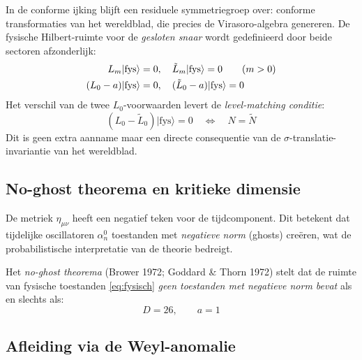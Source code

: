 \documentclass[12pt,a4paper]{article}
\begin{document}
            In de conforme ijking blijft een residuele symmetriegroep over: conforme transformaties van het wereldblad, die precies de Virasoro-algebra genereren. De fysische Hilbert-ruimte voor de \emph{gesloten snaar} wordt gedefinieerd door beide sectoren afzonderlijk:
            \begin{align}
                L_m|\mathrm{fys}\rangle &= 0, \quad \tilde L_m|\mathrm{fys}\rangle = 0 \qquad (m > 0) \notag\\
                (L_0 - a)|\mathrm{fys}\rangle &= 0, \quad (\tilde L_0 - a)|\mathrm{fys}\rangle = 0
                \label{eq:fysisch}
            \end{align}
            Het verschil van de twee $L_0$-voorwaarden levert de \emph{level-matching conditie}:
            \begin{equation}
                (L_0 - \tilde L_0)|\mathrm{fys}\rangle = 0 \quad \Longleftrightarrow \quad N = \tilde N
            \end{equation}
            Dit is geen extra aanname maar een directe consequentie van de $\sigma$-translatie-invariantie van het wereldblad.

        \subsection{No-ghost theorema en kritieke dimensie}

            De metriek $\eta_{\mu\nu}$ heeft een negatief teken voor de tijdcomponent. Dit betekent dat tijdelijke oscillatoren $\alpha_n^0$ toestanden met \emph{negatieve norm} (ghosts) cre\"eren, wat de probabilistische interpretatie van de theorie bedreigt.

            Het \emph{no-ghost theorema} (Brower 1972; Goddard \& Thorn 1972) stelt dat de ruimte van fysische toestanden \eqref{eq:fysisch} \emph{geen toestanden met negatieve norm bevat} als en slechts als:
            \begin{equation}
                \boxed{D = 26, \qquad a = 1}
                \label{eq:kritiek}
            \end{equation}

        \subsection{Afleiding via de Weyl-anomalie}
\end{document}
